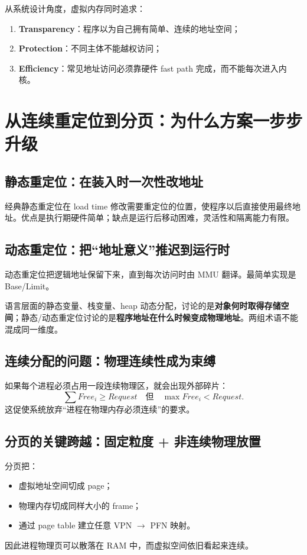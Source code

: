 \documentclass[11pt,a4paper]{ctexart}
\newcommand{\kw}[1]{\textbf{#1}}
\begin{document}
\begin{bridge}[虚拟内存的三个最重要目标]
从系统设计角度，虚拟内存同时追求：
\begin{enumerate}
  \item \kw{Transparency}：程序以为自己拥有简单、连续的地址空间；
  \item \kw{Protection}：不同主体不能越权访问；
  \item \kw{Efficiency}：常见地址访问必须靠硬件 fast path 完成，而不能每次进入内核。
\end{enumerate}
\end{bridge}

\section{从连续重定位到分页：为什么方案一步步升级}

\subsection{静态重定位：在装入时一次性改地址}
经典静态重定位在 load time 修改需要重定位的位置，使程序以后直接使用最终地址。优点是执行期硬件简单；缺点是运行后移动困难，灵活性和隔离能力有限。

\subsection{动态重定位：把“地址意义”推迟到运行时}
动态重定位把逻辑地址保留下来，直到每次访问时由 MMU 翻译。最简单实现是 Base/Limit。

\begin{exam}
语言层面的静态变量、栈变量、heap 动态分配，讨论的是\kw{对象何时取得存储空间}；静态/动态重定位讨论的是\kw{程序地址在什么时候变成物理地址}。两组术语不能混成同一维度。
\end{exam}

\subsection{连续分配的问题：物理连续性成为束缚}
如果每个进程必须占用一段连续物理区，就会出现外部碎片：
\[
\sum Free_i \ge Request
\quad\text{但}\quad
\max Free_i<Request.
\]
这促使系统放弃“进程在物理内存必须连续”的要求。

\subsection{分页的关键跨越：固定粒度 + 非连续物理放置}
分页把：
\begin{itemize}
  \item 虚拟地址空间切成 page；
  \item 物理内存切成同样大小的 frame；
  \item 通过 page table 建立任意 VPN $\to$ PFN 映射。
\end{itemize}
因此进程物理页可以散落在 RAM 中，而虚拟空间依旧看起来连续。
\end{document}
